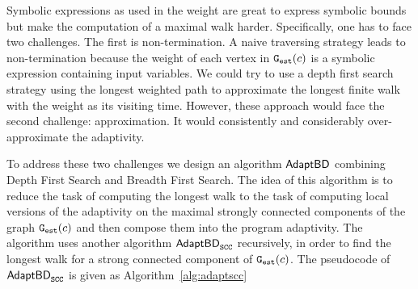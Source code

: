 Symbolic expressions as used in the weight  are great to express symbolic bounds but make the computation of 
a maximal walk harder. Specifically, one has to face two challenges. The first is non-termination.
A naive traversing strategy leads to non-termination
because the weight of each vertex in $\mathtt{{G_{est}}}({c})$
is a symbolic expression containing input variables.
We could try to use a depth first search strategy
using the longest weighted path to approximate
the longest finite walk with the weight as
its visiting time. However, these approach would face the second challenge: approximation.
It would consistently and considerably over-approximate the adaptivity.

To address these two challenges we design an algorithm $\mathsf{AdaptBD}$  combining 
Depth First Search and Breadth First Search.
The idea of this algorithm is to reduce the task of computing the longest walk to the task of computing local versions of the adaptivity on the maximal strongly connected components of the graph $\mathtt{{G_{est}}}(c)$ and then compose them into the program adaptivity. The algorithm  uses  
another algorithm $\mathsf{AdaptBD}_{\mathtt{SCC}}$  recursively, in order to  find the longest walk for a strong connected component of $\mathtt{{G_{est}}}(c)$. The pseudocode of $\mathsf{AdaptBD}_{\mathtt{SCC}}$ is given as Algorithm~\ref{alg:adaptscc}

